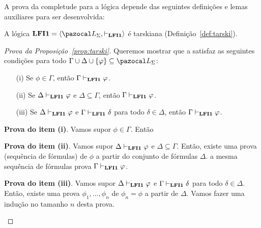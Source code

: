     A prova da completude para a lógica \lfium{} depende das seguintes definições e lemas auxiliares para ser desenvolvida:

    \begin{proposicao}\label{prop:tarski}        
        A lógica $\lfium{} = \langle \ling, \conhil \rangle$ é tarskiana (Definição~\ref{def:tarski}).
    \end{proposicao}

    \begin{proof}[Prova da Proposição~\ref{prop:tarski}]
        Queremos mostrar que a \lfium{} satisfaz as seguintes condições para todo $\Gamma \cup \Delta \cup \{\phi\} \subseteq \ling{}$:
        \begin{itemize}
            \item [(i)] Se $\phi \in \Gamma$, então $\Gamma \vdash_{{\normalfont\textbf{LFI1}}{}} \varphi$.
            \item [(ii)] Se $\Delta \vdash_{{\normalfont\textbf{LFI1}}{}} \varphi$ e $\Delta \subseteq \Gamma$, então $\Gamma \vdash_{{\normalfont\textbf{LFI1}}{}} \varphi$.
            \item [(iii)] Se $\Delta \vdash_{{\normalfont\textbf{LFI1}}{}} \varphi$ e $\Gamma \vdash_{{\normalfont\textbf{LFI1}}{}} \delta$ para todo $\delta \in \Delta$, então $\Gamma \vdash_{{\normalfont\textbf{LFI1}}{}} \varphi$.
        \end{itemize}
        \begin{adjustwidth}{1cm}{}
            \textbf{Prova do item (i)}. Vamos supor $\phi \in \Gamma$. Então 

            \noindent{}\textbf{Prova do item (ii)}. Vamos supor $\Delta \vdash_{{\normalfont\textbf{LFI1}}{}} \varphi$ e $\Delta \subseteq \Gamma$. Então, existe uma prova (sequência de fórmulas) de $\phi$ a partir do conjunto de fórmulas $\Delta$.  a mesma sequência de fórmulas prova $\Gamma \vdash_{{\normalfont\textbf{LFI1}}{}} \varphi$.
            
            \noindent{}\textbf{Prova do item (iii)}. Vamos supor $\Delta \vdash_{{\normalfont\textbf{LFI1}}{}} \varphi$ e $\Gamma \vdash_{{\normalfont\textbf{LFI1}}{}} \delta$ para todo $\delta \in \Delta$. Então, existe uma prova $\phi_1, \ldots, \phi_n$ de $\phi_n = \phi$ a partir de $\Delta$. Vamos fazer uma indução no tamanho $n$ desta prova.
            
            \begin{adjustwidth}{1cm}{}
                

\end{adjustwidth}
\end{adjustwidth}
\end{proof}
